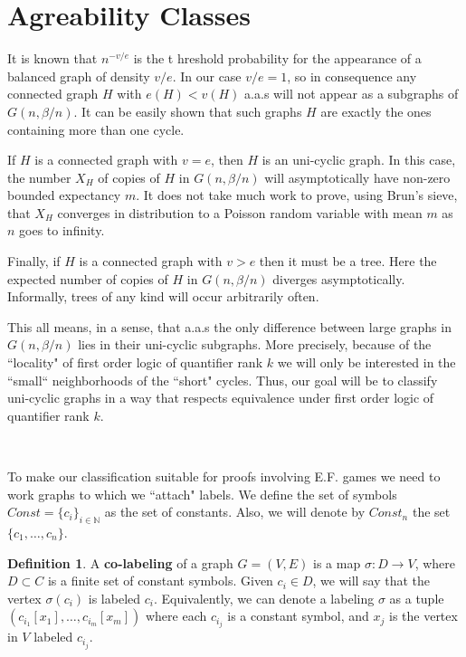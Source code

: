 \documentclass[11pt,notitlepage]{report}
\theoremstyle{definition}
\newtheorem{definition}{Definition}[chapter]
\theoremstyle{remark}
\newcommand{\N}{\mathbb{N}}
\begin{document}
\section{Agreability Classes}


It is known that $n^{-v/e}$ is the t
hreshold probability for the appearance 
of a balanced graph of density $v/e$. 
In our case $v/e=1$, so in consequence any connected graph $H$
with $e(H)< v(H)$ a.a.s will not appear 
as a subgraphs of $G(n,\beta/n)$. It can be easily 
shown that such graphs $H$ are exactly 
the ones containing more than one cycle. \par

If $H$ is a connected graph with $v=e$, then $H$ is an uni-cyclic graph.
In this case, the number $X_H$ of copies of $H$ 
in $G(n,\beta/n)$ will asymptotically have non-zero bounded expectancy $m$. 
It does not take much work to prove, using Brun's sieve, 
that $X_H$ converges in distribution to a Poisson 
random variable with mean $m$ as $n$ goes to infinity.  \par

Finally, if $H$ is a connected graph 
with $v>e$ then it must be a tree. Here 
the expected number of copies of $H$ 
in $G(n,\beta/n)$ diverges asymptotically. 
Informally, trees of any kind will occur arbitrarily often. \par

This all means, in a sense, that a.a.s the only 
difference between large graphs in $G(n,\beta/n)$
lies in their uni-cyclic subgraphs. More precisely,
because of the ``locality" of first order logic of quantifier 
rank $k$ we will only be interested in the 
``small`` neighborhoods of the ``short" cycles.  
Thus, our goal will be to classify uni-cyclic graphs
in a way that respects equivalence under first 
order logic of quantifier rank $k$. \par
~\par
To make our classification suitable for proofs 
involving E.F. games we need to work graphs to which we ``attach" labels. 
We define the set of symbols $Const=\{c_i\}_{i\in \N}$ 
as the set of constants. Also, we will denote by
$Const_n$ the set $\{c_1,\dots, c_n\}$.
 
\begin{definition} 
	A \textbf{co-labeling} of a graph $G=(V,E)$ is a map 
	$\sigma: D\rightarrow V$, where $D\subset C$ is a 
	finite set of constant symbols. Given $c_i\in D$, 
	we will say that the vertex $\sigma(c_i)$ is labeled $c_i$.
	Equivalently, we can denote a labeling $\sigma$ as a tuple
	$(c_{i_1}[x_1],\dots, c_{i_m}[x_m])$ where each $c_{i_j}$
	 is a constant symbol, and $x_j$ is the vertex
	in $V$ labeled $c_{i_j}$.
\end{definition}
\end{document}
